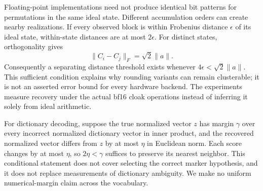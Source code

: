 Floating-point implementations need not produce identical bit patterns for permutations in the same ideal state. Different accumulation orders can create nearby realizations. If every observed block is within Frobenius distance $\epsilon$ of its ideal state, within-state distances are at most $2\epsilon$. For distinct states, orthogonality gives
\begin{equation}
 \|C_i-C_j\|_F=\sqrt2\|a\|.
\end{equation}
Consequently a separating distance threshold exists whenever $4\epsilon<\sqrt2\|a\|$. This sufficient condition explains why rounding variants can remain clusterable; it is not an asserted error bound for every hardware backend. The experiments measure recovery under the actual bf16 cloak operations instead of inferring it solely from ideal arithmetic.

For dictionary decoding, suppose the true normalized vector $z$ has margin $\gamma$ over every incorrect normalized dictionary vector in inner product, and the recovered normalized vector differs from $z$ by at most $\eta$ in Euclidean norm. Each score changes by at most $\eta$, so $2\eta<\gamma$ suffices to preserve its nearest neighbor. This conditional statement does not cover selecting the correct marker hypothesis, and it does not replace measurements of dictionary ambiguity. We make no uniform numerical-margin claim across the vocabulary.
